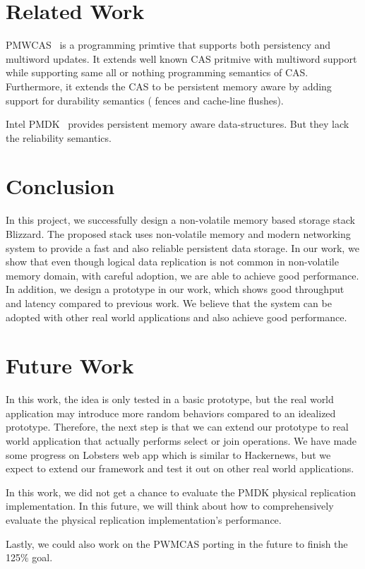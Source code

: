 			\section{Related Work}

			PMWCAS~\cite{pmwcas} is a programming primtive that supports both persistency and multiword updates.
			It extends well known CAS pritmive with multiword support while supporting same all or nothing
			programming semantics of CAS. Furthermore, it extends the CAS to be persistent memory aware by
			adding support for durability semantics ( fences and cache-line flushes).

			Intel PMDK~\cite{pmdk} provides persistent memory aware data-structures. But they lack the reliability semantics.

\section{Conclusion}
In this project, we successfully design a non-volatile memory based storage stack Blizzard. The proposed stack uses non-volatile memory and modern networking system to provide a fast and also reliable persistent data storage. In our work, we show that even though logical data replication is not common in non-volatile memory domain, with careful adoption, we are able to achieve good performance. In addition, we design a prototype in our work, which shows good throughput and latency compared to previous work. We believe that the system can be adopted with other real world applications and also achieve good performance. 

\section{Future Work}
In this work, the idea is only tested in a basic prototype, but the real world application may introduce more random behaviors compared to an idealized prototype. Therefore, the next step is that we can extend our prototype to real world application that actually performs select or join operations. We have made some progress on Lobsters web app which is similar to Hackernews, but we expect to extend our framework and test it out on other real world applications. 

In this work, we did not get a chance to evaluate the PMDK physical replication implementation. In this future, we will think about how to comprehensively evaluate the physical replication implementation's performance. 

Lastly, we could also work on the PWMCAS porting in the future to finish the 125$\%$ goal.
